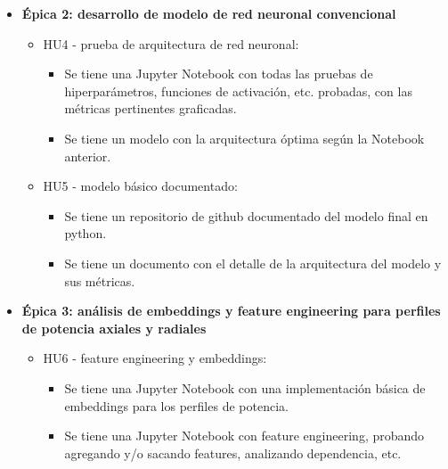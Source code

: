 \documentclass[
11pt, %
]{charter}
\begin{document}
\begin{itemize}
  \item \textbf{Épica 2: desarrollo de modelo de red neuronal convencional}
    \begin{itemize}
      \item HU4 - prueba de arquitectura de red neuronal:
        \begin{itemize}
          \item Se tiene una Jupyter Notebook con todas las pruebas de hiperparámetros, funciones de activación, etc. probadas, con las métricas pertinentes graficadas.
          \item Se tiene un modelo con la arquitectura óptima según la Notebook anterior.
        \end{itemize}
      \item HU5 - modelo básico documentado:
        \begin{itemize}
          \item Se tiene un repositorio de github documentado del modelo final en python.
          \item Se tiene un documento con el detalle de la arquitectura del modelo y sus métricas.
        \end{itemize}
    \end{itemize}
  \item \textbf{Épica 3: análisis de embeddings y feature engineering para perfiles de potencia axiales y radiales}
    \begin{itemize}
      \item HU6 - feature engineering y embeddings:
        \begin{itemize}
          \item Se tiene una Jupyter Notebook con una implementación básica de embeddings para los perfiles de potencia.
          \item Se tiene una Jupyter Notebook con feature engineering, probando agregando y/o sacando features, analizando dependencia, etc.

\end{itemize}
\end{itemize}
\end{itemize}
\end{document}
